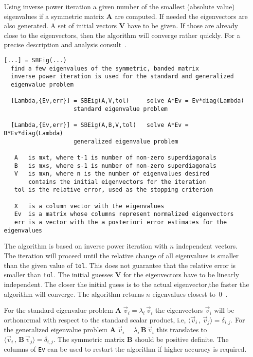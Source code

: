 \documentclass[11pt]{article}
\newcommand{\ID}[1]{\index{#1}}
\begin{document}
Using inverse power iteration a given number of the smallest (absolute value)
eigenvalues if a symmetric matrix \textbf{A} are computed. If needed the
eigenvectors are also generated.  A set of initial vectors \textbf{V} have to
be given. If those are already close to the eigenvectors, then the algorithm
will converge rather quickly. For a precise description and analysis
consult~\cite{GoluVanLoan96}.
\begin{verbatim}
[...] = SBEig(...)
  find a few eigenvalues of the symmetric, banded matrix
  inverse power iteration is used for the standard and generalized
  eigenvalue problem

  [Lambda,{Ev,err}] = SBEig(A,V,tol)     solve A*Ev = Ev*diag(Lambda)
                    standard eigenvalue problem

  [Lambda,{Ev,err}] = SBEig(A,B,V,tol)   solve A*Ev = B*Ev*diag(Lambda)
                    generalized eigenvalue problem

   A   is mxt, where t-1 is number of non-zero superdiagonals
   B   is mxs, where s-1 is number of non-zero superdiagonals
   V   is mxn, where n is the number of eigenvalues desired
       contains the initial eigenvectors for the iteration
   tol is the relative error, used as the stopping criterion

   X   is a column vector with the eigenvalues
   Ev  is a matrix whose columns represent normalized eigenvectors
   err is a vector with the a posteriori error estimates for the eigenvalues
\end{verbatim}

The algorithm is based on inverse power iteration 
\ID{iteration, inverse power}  with $n$ independent vectors.
The iteration will proceed until the relative change of all eigenvalues is
smaller than the given value of \texttt{tol}. This does not guarantee that the
relative error is smaller than \texttt{tol}.  The initial guesses \textbf{V}
for the eigenvectors have to be linearly independent. The closer the initial
guess is to the actual eigenvector,the faster the algorithm will converge. 
The algorithm returns $n$ eigenvalues closest to~0~.


For the standard eigenvalue problem $\mathbf{A}\;\vec v_i = \lambda_i\, \vec
v_i$ the eigenvectors $\vec v_i$ will be orthonormal with respect to the
standard scalar product, i.e, $\langle \vec v_i\,,\,\vec v_j\rangle
=\delta_{i,j}$. For the generalized eigenvalue problem 
$\mathbf{A}\;\vec v_i = \lambda_i\, \mathbf{B}\,\vec v_i$ this translates to
$\langle \vec v_i\,,\,\mathbf{B}\,\vec v_j\rangle=\delta_{i,j}$. The symmetric
matrix \textbf{B} should be positive definite. The columns of \texttt{Ev} can
be used to restart the algorithm if higher accuracy is required.
\end{document}
